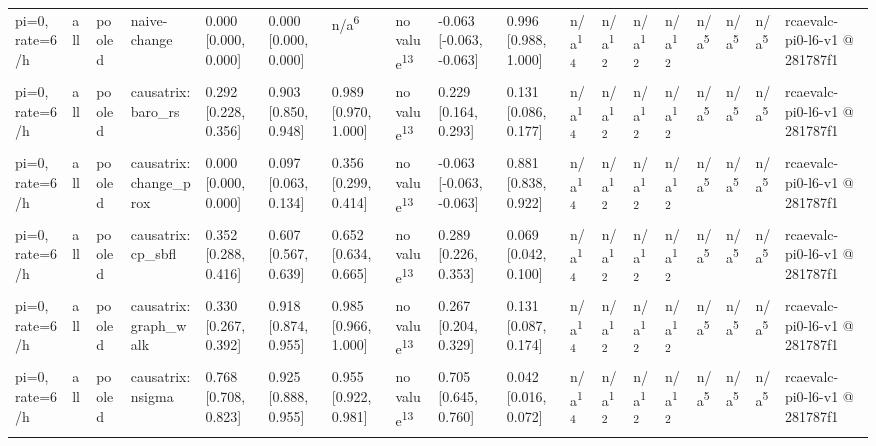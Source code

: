\begin{table}[t]
\begin{tabular}{llllllllllllllllll}
pi=0, rate=6/h & all & pooled & naive-change & 0.000 [0.000, 0.000] & 0.000 [0.000, 0.000] & n/a\textsuperscript{6} & no value\textsuperscript{13} & -0.063 [-0.063, -0.063] & 0.996 [0.988, 1.000] & n/a\textsuperscript{14} & n/a\textsuperscript{12} & n/a\textsuperscript{12} & n/a\textsuperscript{12} & n/a\textsuperscript{5} & n/a\textsuperscript{5} & n/a\textsuperscript{5} & rcaevalc-pi0-l6-v1 @ 281787f1 \\
pi=0, rate=6/h & all & pooled & causatrix:baro\_rs & 0.292 [0.228, 0.356] & 0.903 [0.850, 0.948] & 0.989 [0.970, 1.000] & no value\textsuperscript{13} & 0.229 [0.164, 0.293] & 0.131 [0.086, 0.177] & n/a\textsuperscript{14} & n/a\textsuperscript{12} & n/a\textsuperscript{12} & n/a\textsuperscript{12} & n/a\textsuperscript{5} & n/a\textsuperscript{5} & n/a\textsuperscript{5} & rcaevalc-pi0-l6-v1 @ 281787f1 \\
pi=0, rate=6/h & all & pooled & causatrix:change\_prox & 0.000 [0.000, 0.000] & 0.097 [0.063, 0.134] & 0.356 [0.299, 0.414] & no value\textsuperscript{13} & -0.063 [-0.063, -0.063] & 0.881 [0.838, 0.922] & n/a\textsuperscript{14} & n/a\textsuperscript{12} & n/a\textsuperscript{12} & n/a\textsuperscript{12} & n/a\textsuperscript{5} & n/a\textsuperscript{5} & n/a\textsuperscript{5} & rcaevalc-pi0-l6-v1 @ 281787f1 \\
pi=0, rate=6/h & all & pooled & causatrix:cp\_sbfl & 0.352 [0.288, 0.416] & 0.607 [0.567, 0.639] & 0.652 [0.634, 0.665] & no value\textsuperscript{13} & 0.289 [0.226, 0.353] & 0.069 [0.042, 0.100] & n/a\textsuperscript{14} & n/a\textsuperscript{12} & n/a\textsuperscript{12} & n/a\textsuperscript{12} & n/a\textsuperscript{5} & n/a\textsuperscript{5} & n/a\textsuperscript{5} & rcaevalc-pi0-l6-v1 @ 281787f1 \\
pi=0, rate=6/h & all & pooled & causatrix:graph\_walk & 0.330 [0.267, 0.392] & 0.918 [0.874, 0.955] & 0.985 [0.966, 1.000] & no value\textsuperscript{13} & 0.267 [0.204, 0.329] & 0.131 [0.087, 0.174] & n/a\textsuperscript{14} & n/a\textsuperscript{12} & n/a\textsuperscript{12} & n/a\textsuperscript{12} & n/a\textsuperscript{5} & n/a\textsuperscript{5} & n/a\textsuperscript{5} & rcaevalc-pi0-l6-v1 @ 281787f1 \\
pi=0, rate=6/h & all & pooled & causatrix:nsigma & 0.768 [0.708, 0.823] & 0.925 [0.888, 0.955] & 0.955 [0.922, 0.981] & no value\textsuperscript{13} & 0.705 [0.645, 0.760] & 0.042 [0.016, 0.072] & n/a\textsuperscript{14} & n/a\textsuperscript{12} & n/a\textsuperscript{12} & n/a\textsuperscript{12} & n/a\textsuperscript{5} & n/a\textsuperscript{5} & n/a\textsuperscript{5} & rcaevalc-pi0-l6-v1 @ 281787f1 \\

\end{tabular}
\end{table}
